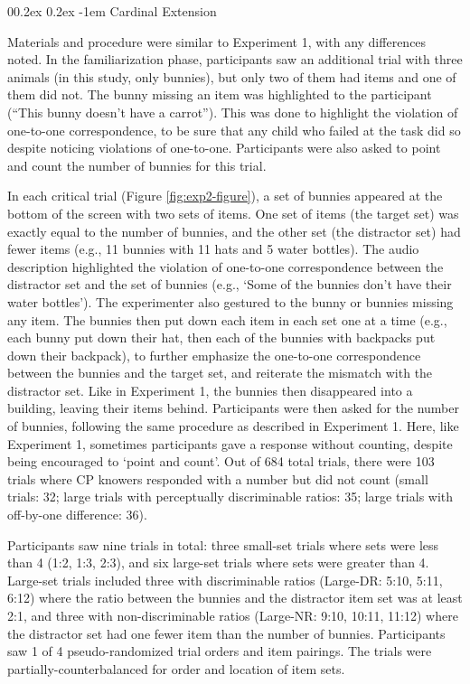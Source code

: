 \documentclass[
  man,floatsintext]{apa7}
\makeatletter
\let\oldparagraph\paragraph
\renewcommand{\paragraph}[1]{\oldparagraph{#1}\mbox{}}
\renewcommand{\paragraph}{\@startsection{paragraph}{4}{\parindent}%
  {0\baselineskip \@plus 0.2ex \@minus 0.2ex}%
  {-1em}%
  {\normalfont\normalsize\bfseries\itshape\typesectitle}}
\renewcommand{\paragraph}{\@startsection{paragraph}{4}{\parindent}%
  {0\baselineskip \@plus 0.2ex \@minus 0.2ex}%
  {-1em}%
  {\normalfont\normalsize\bfseries\typesectitle}}
\makeatother
\begin{document}
\hypertarget{cardinal-extension-1}{%
\paragraph{Cardinal Extension}\label{cardinal-extension-1}}

Materials and procedure were similar to Experiment 1, with any differences noted. In the familiarization phase, participants saw an additional trial with three animals (in this study, only bunnies), but only two of them had items and one of them did not. The bunny missing an item was highlighted to the participant (``This bunny doesn't have a carrot''). This was done to highlight the violation of one-to-one correspondence, to be sure that any child who failed at the task did so despite noticing violations of one-to-one. Participants were also asked to point and count the number of bunnies for this trial.

In each critical trial (Figure \ref{fig:exp2-figure}), a set of bunnies appeared at the bottom of the screen with two sets of items. One set of items (the target set) was exactly equal to the number of bunnies, and the other set (the distractor set) had fewer items (e.g., 11 bunnies with 11 hats and 5 water bottles). The audio description highlighted the violation of one-to-one correspondence between the distractor set and the set of bunnies (e.g., `Some of the bunnies don't have their water bottles'). The experimenter also gestured to the bunny or bunnies missing any item. The bunnies then put down each item in each set one at a time (e.g., each bunny put down their hat, then each of the bunnies with backpacks put down their backpack), to further emphasize the one-to-one correspondence between the bunnies and the target set, and reiterate the mismatch with the distractor set. Like in Experiment 1, the bunnies then disappeared into a building, leaving their items behind. Participants were then asked for the number of bunnies, following the same procedure as described in Experiment 1. Here, like Experiment 1, sometimes participants gave a response without counting, despite being encouraged to `point and count'. Out of 684 total trials, there were 103 trials where CP knowers responded with a number but did not count (small trials: 32; large trials with perceptually discriminable ratios: 35; large trials with off-by-one difference: 36).

Participants saw nine trials in total: three small-set trials where sets were less than 4 (1:2, 1:3, 2:3), and six large-set trials where sets were greater than 4. Large-set trials included three with discriminable ratios (Large-DR: 5:10, 5:11, 6:12) where the ratio between the bunnies and the distractor item set was at least 2:1, and three with non-discriminable ratios (Large-NR: 9:10, 10:11, 11:12) where the distractor set had one fewer item than the number of bunnies. Participants saw 1 of 4 pseudo-randomized trial orders and item pairings. The trials were partially-counterbalanced for order and location of item sets.
\end{document}
